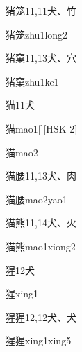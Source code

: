 \begin{Entry}{猪笼}{11,11}{⽝、⽵}
  \begin{Phonetics}{猪笼}{zhu1long2}
  \end{Phonetics}
\end{Entry}

\begin{Entry}{猪窠}{11,13}{⽝、⽳}
  \begin{Phonetics}{猪窠}{zhu1ke1}
  \end{Phonetics}
\end{Entry}

\begin{Entry}{猫}{11}{⽝}
  \begin{Phonetics}{猫}{mao1}[][HSK 2]
  \end{Phonetics}
  \begin{Phonetics}{猫}{mao2}
  \end{Phonetics}
\end{Entry}

\begin{Entry}{猫腰}{11,13}{⽝、⾁}
  \begin{Phonetics}{猫腰}{mao2yao1}
  \end{Phonetics}
\end{Entry}

\begin{Entry}{猫熊}{11,14}{⽝、⽕}
  \begin{Phonetics}{猫熊}{mao1xiong2}
  \end{Phonetics}
\end{Entry}

\begin{Entry}{猩}{12}{⽝}
  \begin{Phonetics}{猩}{xing1}
  \end{Phonetics}
\end{Entry}

\begin{Entry}{猩猩}{12,12}{⽝、⽝}
  \begin{Phonetics}{猩猩}{xing1xing5}
  \end{Phonetics}
\end{Entry}

